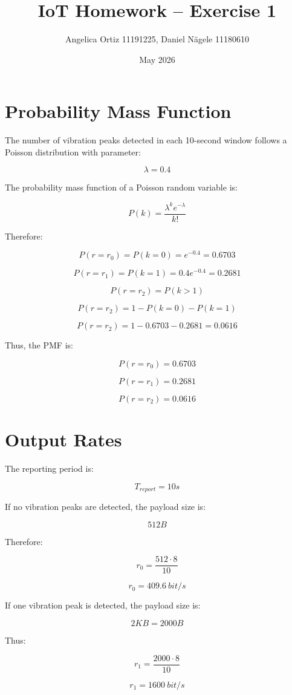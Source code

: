 \documentclass[a4paper,12pt]{article}
\title{IoT Homework -- Exercise 1}
\author{Angelica Ortiz 11191225, Daniel Nägele 11180610}
\date{May 2026}
\begin{document}
\maketitle
\thispagestyle{empty}
\newpage

\tableofcontents
\newpage

\section{Probability Mass Function}

The number of vibration peaks detected in each 10-second window follows a Poisson distribution with parameter:

\[
\lambda = 0.4
\]

The probability mass function of a Poisson random variable is:

\[
P(k)=\frac{\lambda^k e^{-\lambda}}{k!}
\]

Therefore:

\[
P(r=r_0)=P(k=0)=e^{-0.4}=0.6703
\]

\[
P(r=r_1)=P(k=1)=0.4e^{-0.4}=0.2681
\]

\[
P(r=r_2)=P(k>1)
\]

\[
P(r=r_2)=1-P(k=0)-P(k=1)
\]

\[
P(r=r_2)=1-0.6703-0.2681=0.0616
\]

Thus, the PMF is:

\[
P(r=r_0)=0.6703
\]

\[
P(r=r_1)=0.2681
\]

\[
P(r=r_2)=0.0616
\]

\section{Output Rates}

The reporting period is:

\[
T_{report}=10s
\]

If no vibration peaks are detected, the payload size is:

\[
512B
\]

Therefore:

\[
r_0=\frac{512\cdot8}{10}
\]

\[
r_0=409.6\ bit/s
\]

If one vibration peak is detected, the payload size is:

\[
2KB=2000B
\]

Thus:

\[
r_1=\frac{2000\cdot8}{10}
\]

\[
r_1=1600\ bit/s
\]
\end{document}

